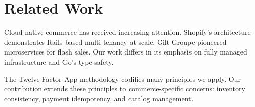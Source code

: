 \section{Related Work}


Cloud-native commerce has received increasing attention. Shopify's architecture \cite{shopify2014} demonstrates Rails-based multi-tenancy at scale. Gilt Groupe \cite{gilt2013} pioneered microservices for flash sales. Our work differs in its emphasis on fully managed infrastructure and Go's type safety.

The Twelve-Factor App methodology \cite{wiggins2011} codifies many principles we apply. Our contribution extends these principles to commerce-specific concerns: inventory consistency, payment idempotency, and catalog management.


